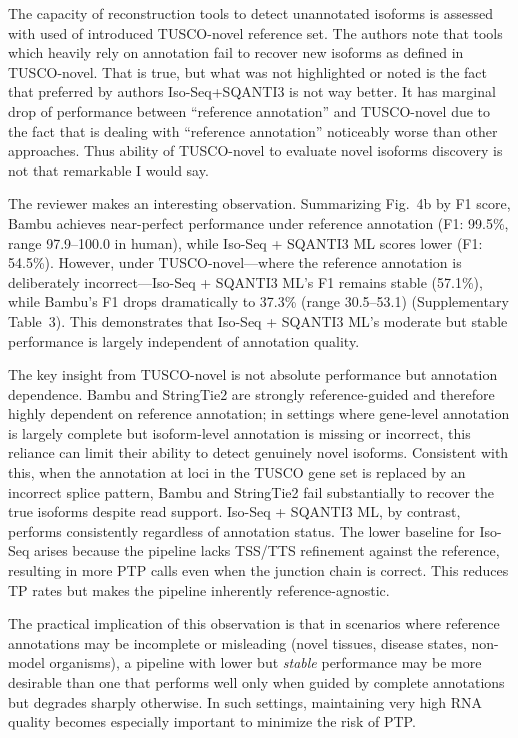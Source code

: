 \documentclass[11pt]{article}
\begin{document}
\begin{reviewercomment}
The capacity of reconstruction tools to detect unannotated isoforms is assessed with used of introduced TUSCO-novel reference set. The authors note that tools which heavily rely on annotation fail to recover new isoforms as defined in TUSCO-novel. That is true, but what was not highlighted or noted is the fact that preferred by authors Iso-Seq+SQANTI3 is not way better. It has marginal drop of performance between ``reference annotation'' and TUSCO-novel due to the fact that is dealing with ``reference annotation'' noticeably worse than other approaches. Thus ability of TUSCO-novel to evaluate novel isoforms discovery is not that remarkable I would say.
\end{reviewercomment}

\begin{responseboxnew}
The reviewer makes an interesting observation. Summarizing Fig.~4b by F1 score, Bambu achieves near-perfect performance under reference annotation (F1: 99.5\%, range 97.9--100.0 in human), while Iso-Seq + SQANTI3 ML scores lower (F1: 54.5\%). However, under TUSCO-novel---where the reference annotation is deliberately incorrect---Iso-Seq + SQANTI3 ML's F1 remains stable (57.1\%), while Bambu's F1 drops dramatically to 37.3\% (range 30.5--53.1) (Supplementary Table~3). This demonstrates that Iso-Seq + SQANTI3 ML's moderate but stable performance is largely independent of annotation quality.

The key insight from TUSCO-novel is not absolute performance but annotation dependence. Bambu and StringTie2 are strongly reference-guided and therefore highly dependent on reference annotation; in settings where gene-level annotation is largely complete but isoform-level annotation is missing or incorrect, this reliance can limit their ability to detect genuinely novel isoforms. Consistent with this, when the annotation at loci in the TUSCO gene set is replaced by an incorrect splice pattern, Bambu and StringTie2 fail substantially to recover the true isoforms despite read support. Iso-Seq + SQANTI3 ML, by contrast, performs consistently regardless of annotation status. The lower baseline for Iso-Seq arises because the pipeline lacks TSS/TTS refinement against the reference, resulting in more PTP calls even when the junction chain is correct. This reduces TP rates but makes the pipeline inherently reference-agnostic.

The practical implication of this observation is that in scenarios where reference annotations may be incomplete or misleading (novel tissues, disease states, non-model organisms), a pipeline with lower but \textit{stable} performance may be more desirable than one that performs well only when guided by complete annotations but degrades sharply otherwise. In such settings, maintaining very high RNA quality becomes especially important to minimize the risk of PTP.


\end{responseboxnew}
\end{document}
